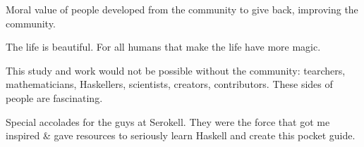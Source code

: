 \documentclass[a4paper,14pt,oneside]{book}
\begin{document}
Moral value of people developed from the community to give back, improving the community.

The life is beautiful.
For all humans that make the life have more magic.

This study and work would not be possible without the community: tearchers, mathematicians, Haskellers, scientists, creators, contributors. These sides of people are fascinating.


Special accolades for the guys at Serokell. They were the force that got me inspired \& gave resources to seriously learn Haskell and create this pocket guide.
\end{document}
